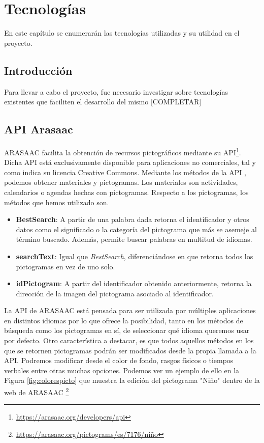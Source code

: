 \chapter{Tecnologías}
\label{cap:introduccion}


\begin{resumen}
	En este capítulo se enumerarán las tecnologías utilizadas y su utilidad en el proyecto.
\end{resumen}

\label{cap1:sec:Motivacion}


\section{Introducción}
Para llevar a cabo el proyecto, fue necesario investigar sobre tecnologías existentes que faciliten el desarrollo del mismo [COMPLETAR]
\section{API Arasaac}
ARASAAC facilita la obtención de recursos pictográficos mediante su API\footnote{\url{https://arasaac.org/developers/api}}. Dicha API está exclusivamente disponible para aplicaciones no comerciales, tal y como indica su licencia Creative Commons.
Mediante los métodos de la API , podemos obtener materiales y pictogramas. Los materiales  son actividades, calendarios o agendas hechas con pictogramas. Respecto a los pictogramas, los métodos que hemos utilizado son.
\begin{itemize}
	\item \textbf{BestSearch}: A partir de una palabra dada retorna el identificador y otros datos como el significado o la categoría del pictograma que más se asemeje al término buscado. Además, permite buscar palabras en multitud de idiomas.
	
	\item \textbf{searchText}: Igual que \textit{BestSearch}, diferenciándose en que retorna todos los pictogramas en vez de uno solo.
	
	\item \textbf{idPictogram}: A partir del identificador obtenido anteriormente, retorna la dirección de la imagen del pictograma asociado al identificador. 
	

	
		
\end{itemize}

La API de ARASAAC está pensada para ser utilizada por múltiples aplicaciones en distintos idiomas por lo que ofrece la posibilidad, tanto en los métodos de búsqueda como los pictogramas en sí, de seleccionar qué idioma queremos usar por defecto.
Otro característica a destacar, es que todos aquellos métodos en los que se retornen pictogramas podrán ser modificados desde la propia llamada a la API. Podremos modificar desde el color de fondo, rasgos físicos o tiempos verbales entre otras muchas opciones. Podemos ver un ejemplo de ello en la Figura  \ref{fig:colorespicto} que muestra la edición del pictograma "Niño" dentro de la web de ARASAAC \footnote{\url{https://arasaac.org/pictograms/es/7176/niño}}

